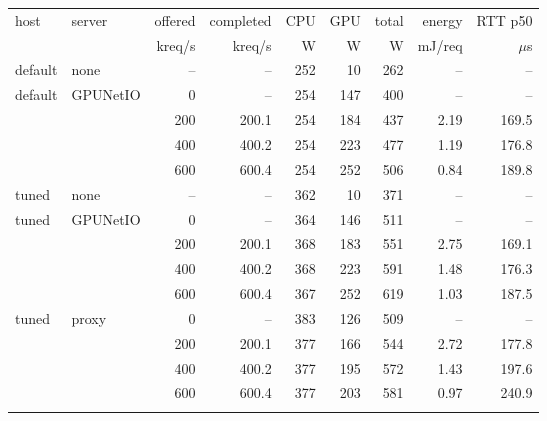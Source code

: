 \begin{tabular}{llrrrrrrr}\toprule
host & server & offered & completed & CPU & GPU & total & energy & RTT p50 \\
 & & kreq/s & kreq/s & W & W & W & mJ/req & $\mu$s \\ \midrule
default & none & -- & -- & 252 & 10 & 262 & -- & -- \\
default & GPUNetIO & 0 & -- & 254 & 147 & 400 & -- & -- \\
 & & 200 & 200.1 & 254 & 184 & 437 & 2.19 & 169.5 \\
 & & 400 & 400.2 & 254 & 223 & 477 & 1.19 & 176.8 \\
 & & 600 & 600.4 & 254 & 252 & 506 & 0.84 & 189.8 \\
\addlinespace
tuned & none & -- & -- & 362 & 10 & 371 & -- & -- \\
tuned & GPUNetIO & 0 & -- & 364 & 146 & 511 & -- & -- \\
 & & 200 & 200.1 & 368 & 183 & 551 & 2.75 & 169.1 \\
 & & 400 & 400.2 & 368 & 223 & 591 & 1.48 & 176.3 \\
 & & 600 & 600.4 & 367 & 252 & 619 & 1.03 & 187.5 \\
\addlinespace
tuned & proxy & 0 & -- & 383 & 126 & 509 & -- & -- \\
 & & 200 & 200.1 & 377 & 166 & 544 & 2.72 & 177.8 \\
 & & 400 & 400.2 & 377 & 195 & 572 & 1.43 & 197.6 \\
 & & 600 & 600.4 & 377 & 203 & 581 & 0.97 & 240.9 \\
\addlinespace
\bottomrule\end{tabular}
